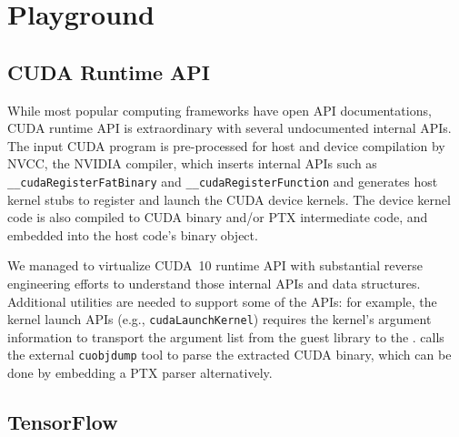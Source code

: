 
\section*{Playground}

\subsection{CUDA Runtime API}

While most popular computing frameworks have open API documentations,
CUDA runtime API is extraordinary with several undocumented internal APIs.
The input CUDA program is pre-processed for host and device compilation by NVCC,
the NVIDIA compiler,
which inserts internal APIs such as \lstinline|__cudaRegisterFatBinary|
and \lstinline|__cudaRegisterFunction| and generates host kernel stubs to register and
launch the CUDA device kernels.
The device kernel code is also compiled to CUDA binary and/or PTX intermediate code,
and embedded into the host code's binary object.

We managed to virtualize CUDA~10 runtime API with substantial reverse engineering efforts
to understand those internal APIs and data structures.
Additional utilities are needed to support some of the APIs:
for example, the kernel launch APIs (e.g., \lstinline|cudaLaunchKernel|)
requires the kernel's argument information to transport the argument list from the guest library to the \worker.
\Model calls the external \lstinline|cuobjdump| tool to parse the extracted CUDA binary,
which can be done by embedding a PTX parser alternatively.


\subsection{TensorFlow}

